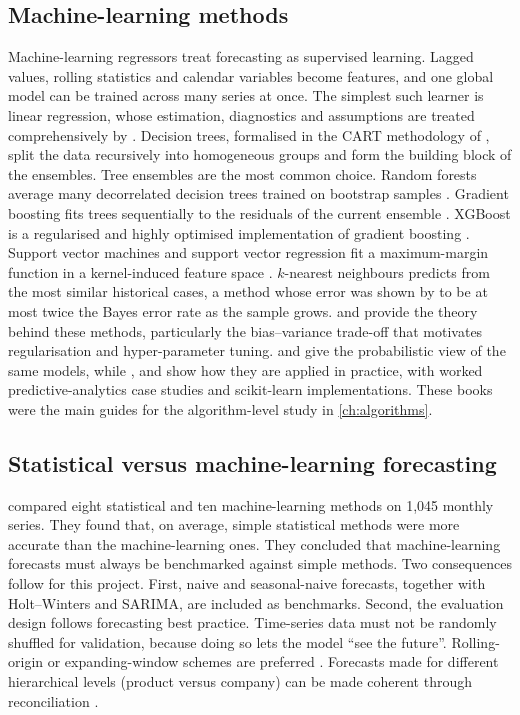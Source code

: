 \subsection{Machine-learning methods}
Machine-learning regressors treat forecasting as supervised learning. Lagged values, rolling statistics and
calendar variables become features, and one global model can be trained across many series at once.
The simplest such learner is linear regression, whose estimation, diagnostics and assumptions are treated
comprehensively by \citet{montgomery2021}. Decision trees, formalised in the CART methodology of
\citet{breiman1984}, split the data recursively into homogeneous groups and form the building block of the
ensembles. Tree ensembles are the most common choice. Random forests average many decorrelated decision trees trained on
bootstrap samples \citep{breiman2001}. Gradient boosting fits trees sequentially to the residuals of the current
ensemble \citep{friedman2001}. XGBoost is a regularised and highly optimised implementation of gradient
boosting \citep{chen2016}. Support vector machines and support vector regression fit a maximum-margin function
in a kernel-induced feature space \citep{cortes1995, scholkopf2002}. $k$-nearest neighbours predicts from the
most similar historical cases, a method whose error was shown by \citet{cover1967} to be at most twice the
Bayes error rate as the sample grows. \citet{hastie2009} and \citet{james2021} provide the theory behind these
methods, particularly the bias--variance trade-off that motivates regularisation and hyper-parameter tuning.
\citet{bishop2006} and \citet{murphy2022} give the probabilistic view of the same models, while
\citet{kelleher2020}, \citet{geron2022} and \citet{raschka2022} show how they are applied in practice, with
worked predictive-analytics case studies and scikit-learn implementations. These books were the main guides for
the algorithm-level study in \cref{ch:algorithms}.

\subsection{Statistical versus machine-learning forecasting}
\citet{makridakis2018} compared eight statistical and ten machine-learning methods on 1,045 monthly series.
They found that, on average, simple statistical methods were more accurate than the machine-learning ones. They
concluded that machine-learning forecasts must always be benchmarked against simple methods. Two consequences
follow for this project. First, naive and seasonal-naive forecasts, together with Holt--Winters and SARIMA, are
included as benchmarks. Second, the evaluation design follows forecasting best practice. Time-series data must
not be randomly shuffled for validation, because doing so lets the model ``see the future''. Rolling-origin or
expanding-window schemes are preferred \citep{bergmeir2012, hyndman2021}. Forecasts made for different
hierarchical levels (product versus company) can be made coherent through reconciliation
\citep{athanasopoulos2009}.


